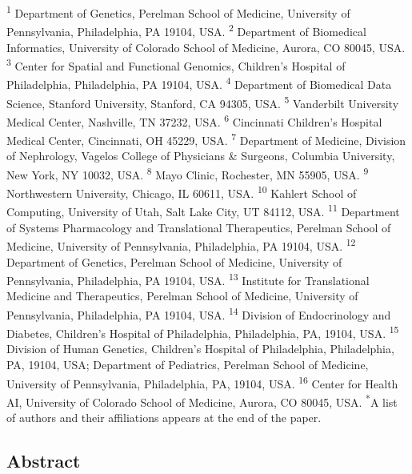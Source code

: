 \documentclass[
  a4paper,
]{article}
\begin{document}
\textsuperscript{1} Department of Genetics, Perelman School of Medicine, University of Pennsylvania, Philadelphia, PA 19104, USA.
\textsuperscript{2} Department of Biomedical Informatics, University of Colorado School of Medicine, Aurora, CO 80045, USA.
\textsuperscript{3} Center for Spatial and Functional Genomics, Children's Hospital of Philadelphia, Philadelphia, PA 19104, USA.
\textsuperscript{4} Department of Biomedical Data Science, Stanford University, Stanford, CA 94305, USA.
\textsuperscript{5} Vanderbilt University Medical Center, Nashville, TN 37232, USA.
\textsuperscript{6} Cincinnati Children's Hospital Medical Center, Cincinnati, OH 45229, USA.
\textsuperscript{7} Department of Medicine, Division of Nephrology, Vagelos College of Physicians \& Surgeons, Columbia University, New York, NY 10032, USA.
\textsuperscript{8} Mayo Clinic, Rochester, MN 55905, USA.
\textsuperscript{9} Northwestern University, Chicago, IL 60611, USA.
\textsuperscript{10} Kahlert School of Computing, University of Utah, Salt Lake City, UT 84112, USA.
\textsuperscript{11} Department of Systems Pharmacology and Translational Therapeutics, Perelman School of Medicine, University of Pennsylvania, Philadelphia, PA 19104, USA.
\textsuperscript{12} Department of Genetics, Perelman School of Medicine, University of Pennsylvania, Philadelphia, PA 19104, USA.
\textsuperscript{13} Institute for Translational Medicine and Therapeutics, Perelman School of Medicine, University of Pennsylvania, Philadelphia, PA 19104, USA.
\textsuperscript{14} Division of Endocrinology and Diabetes, Children's Hospital of Philadelphia, Philadelphia, PA, 19104, USA.
\textsuperscript{15} Division of Human Genetics, Children's Hospital of Philadelphia, Philadelphia, PA, 19104, USA; Department of Pediatrics, Perelman School of Medicine, University of Pennsylvania, Philadelphia, PA, 19104, USA.
\textsuperscript{16} Center for Health AI, University of Colorado School of Medicine, Aurora, CO 80045, USA.
\textsuperscript{*}A list of authors and their affiliations appears at the end of the paper.


\hypertarget{abstract}{%
\subsection{Abstract}\label{abstract}}
\end{document}
